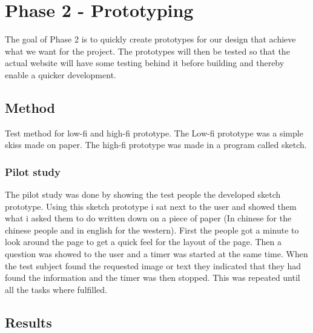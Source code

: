 
\chapter{Phase 2 - Prototyping} %

\label{Chapter5} %

The goal of Phase 2 is to quickly create prototypes for our design that achieve what we want for the project. The prototypes will then be tested so that the actual website will have some testing behind it before building and thereby enable a quicker development.

\section{Method}
Test method for low-fi and high-fi prototype. The Low-fi prototype was a simple skiss made on paper. The high-fi prototype was made in a program called sketch.
\subsection{Pilot study}
The pilot study was done by showing the test people the developed sketch prototype. Using this sketch prototype i sat next to the user and showed them what i asked them to do written down on a piece of paper (In chinese for the chinese people and in english for the western). First the people got a minute to look around the page to get a quick feel for the layout of the page. Then a question was showed to the user and a timer was started at the same time. When the test subject found the requested image or text they indicated that they had found the information and the timer was then stopped. This was repeated until all the tasks where fulfilled.

\section{Results}
